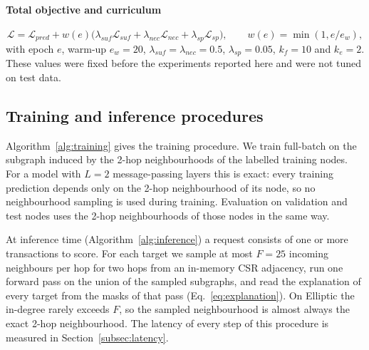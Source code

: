 \paragraph{Total objective and curriculum}
\begin{equation}
\mathcal{L}=\mathcal{L}_{pred}+w(e)\big(\lambda_{suf}\mathcal{L}_{suf}+\lambda_{nec}\mathcal{L}_{nec}+\lambda_{sp}\mathcal{L}_{sp}\big),\qquad w(e)=\min(1,e/e_{w}),
\label{eq:total}
\end{equation}
with epoch $e$, warm-up $e_w=20$, $\lambda_{suf}=\lambda_{nec}=0.5$, $\lambda_{sp}=0.05$, $k_f=10$ and $k_e=2$. These values were fixed before the experiments reported here and were not tuned on test data.

\subsection{Training and inference procedures}
\label{subsec:inference}

Algorithm~\ref{alg:training} gives the training procedure. We train full-batch on the subgraph induced by the 2-hop neighbourhoods of the labelled training nodes. For a model with $L=2$ message-passing layers this is exact: every training prediction depends only on the 2-hop neighbourhood of its node, so no neighbourhood sampling is used during training. Evaluation on validation and test nodes uses the 2-hop neighbourhoods of those nodes in the same way.

At inference time (Algorithm~\ref{alg:inference}) a request consists of one or more transactions to score. For each target we sample at most $F=25$ incoming neighbours per hop for two hops from an in-memory CSR adjacency, run one forward pass on the union of the sampled subgraphs, and read the explanation of every target from the masks of that pass (Eq.~\ref{eq:explanation}). On Elliptic the in-degree rarely exceeds $F$, so the sampled neighbourhood is almost always the exact 2-hop neighbourhood. The latency of every step of this procedure is measured in Section~\ref{subsec:latency}.

